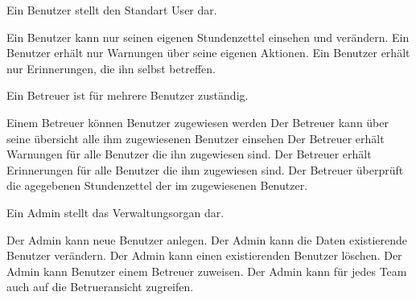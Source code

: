 \begin{requirements}
    Ein Benutzer stellt den Standart User dar.
    \begin{requirements}
         Ein Benutzer kann nur seinen eigenen Stundenzettel einsehen und verändern.
         Ein Benutzer erhält nur Warnungen über seine eigenen Aktionen.
         Ein Benutzer erhält nur Erinnerungen, die ihn selbst betreffen.
    \end{requirements}

        Ein Betreuer ist für mehrere Benutzer zuständig.
        \begin{requirements}
             Einem Betreuer können Benutzer zugewiesen werden
             Der Betreuer kann über seine übersicht alle ihm zugewiesenen Benutzer einsehen
             Der Betreuer erhält Warnungen für alle Benutzer die ihn zugewiesen sind.
             Der Betreuer erhält Erinnerungen für alle Benutzer die ihm zugewiesen sind.
             Der Betreuer überprüft die agegebenen Stundenzettel der im zugewiesenen Benutzer.
        \end{requirements}

        Ein Admin stellt das Verwaltungsorgan dar.
        \begin{requirements}
             Der Admin kann neue Benutzer anlegen.
             Der Admin kann die Daten existierende Benutzer verändern.
             Der Admin kann einen existierenden Benutzer löschen.
             Der Admin kann Benutzer einem Betreuer zuweisen.
             Der Admin kann für jedes Team auch auf die Betrueransicht zugreifen.
        \end{requirements}
\end{requirements}

